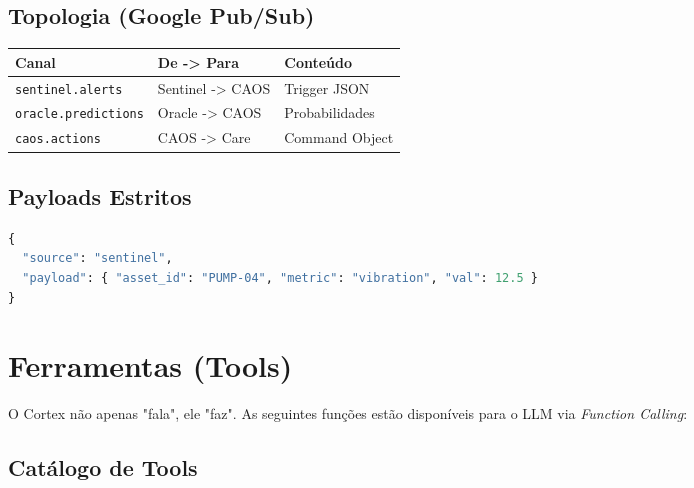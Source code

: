 \documentclass[12pt, a4paper]{article}
\begin{document}
\subsection{Topologia (Google Pub/Sub)}
\begin{table}[h!]
\centering
\begin{tabular}{|l|l|l|}
\hline
\textbf{Canal} & \textbf{De -> Para} & \textbf{Conteúdo} \\ \hline
\texttt{sentinel.alerts} & Sentinel -> CAOS & Trigger JSON \\ \hline
\texttt{oracle.predictions} & Oracle -> CAOS & Probabilidades \\ \hline
\texttt{caos.actions} & CAOS -> Care & Command Object \\ \hline
\end{tabular}
\end{table}

\subsection{Payloads Estritos}
\begin{lstlisting}[language=Python, caption=Exemplo de Trigger]
{
  "source": "sentinel", 
  "payload": { "asset_id": "PUMP-04", "metric": "vibration", "val": 12.5 }
}
\end{lstlisting}

\newpage



\section{Ferramentas (Tools)}
\label{sec:tools}

O Cortex não apenas "fala", ele "faz". As seguintes funções estão disponíveis para o LLM via \textit{Function Calling}:

\subsection{Catálogo de Tools}
\end{document}
